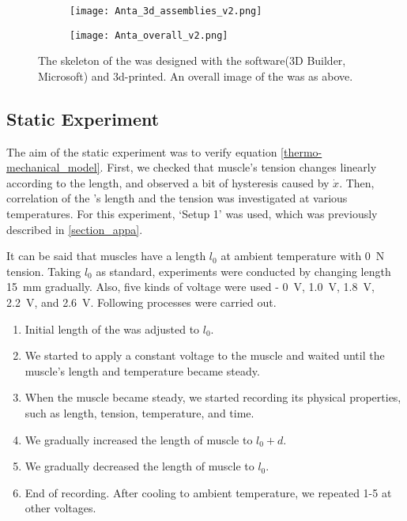 
\begin{figure}[t]
	\centering
	\begin{subfigure}[t]{0.3\textwidth}
		\centering\texttt{[image: Anta\_3d\_assemblies\_v2.png]}
		\caption{\label{3d_assemblies}}
	\end{subfigure}
	
	\begin{subfigure}[t]{0.81\textwidth}
		\centering\texttt{[image: Anta\_overall\_v2.png]}
		\caption{\label{anta_overall}}
	\end{subfigure}
	
	\caption[\Anta]{ The skeleton of the \anta was designed with the software(3D Builder, Microsoft) and 3d-printed.  An overall image of the \anta was as above.}
	\label{anta_design}
\end{figure}

\subsection{Static Experiment} \label{subsection_static_experiment}
The aim of the static experiment was to verify equation \eqref{thermo-mechanical_model}.
First, we checked that muscle's tension changes linearly according to the length, and observed a bit of hysteresis caused by $\dot{x}$.
Then, correlation of the \scpnospace's length and the tension was investigated at various temperatures. 
For this experiment, `Setup 1' was used, which was previously described in \ref{section_appa}.

It can be said that muscles have a length $l_{0}$ at ambient temperature with \SI{0}{\newton} tension. Taking $l_{0}$ as standard, experiments were conducted by changing length \SI{15}{\milli\meter} gradually. Also, five kinds of voltage were used - \SI{0}{\volt}, \SI{1.0}{\volt}, \SI{1.8}{\volt}, \SI{2.2}{\volt}, and \SI{2.6}{\volt}. 
Following processes were carried out.

\begin{enumerate}
	\item Initial length of the \scp was adjusted to $l_0$.
	\item We started to apply a constant voltage to the muscle and waited until the muscle's length and temperature became steady.
	\item When the muscle became steady, we started recording its physical properties, such as length, tension, temperature, and time.
	\item We gradually increased the length of muscle to $l_0+d$.
	\item We gradually decreased the length of muscle to $l_0$.
	\item End of recording. After cooling to ambient temperature, we repeated 1-5 at other voltages.
\end{enumerate}

